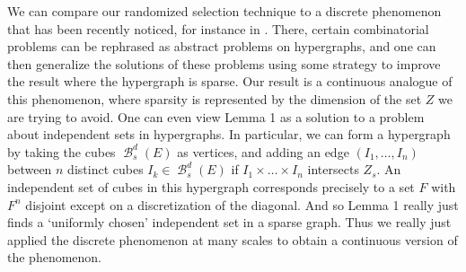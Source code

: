 \documentclass[dvipsnames,letterpaper,12pt]{article}
\numberwithin{equation}{section}
\theoremstyle{plain}
\theoremstyle{remark}
\DeclareMathOperator{\B}{\mathcal{B}}
\begin{document}
We can compare our randomized selection technique to a discrete phenomenon that has been recently noticed, for instance in \cite{BaloghMorrisSamotij}. There, certain combinatorial problems can be rephrased as abstract problems on hypergraphs, and one can then generalize the solutions of these problems using some strategy to improve the result where the hypergraph is sparse. Our result is a continuous analogue of this phenomenon, where sparsity is represented by the dimension of the set $Z$ we are trying to avoid. One can even view Lemma 1 as a solution to a problem about independent sets in hypergraphs. In particular, we can form a hypergraph by taking the cubes $\B^d_s(E)$ as vertices, and adding an edge $(I_1, \dots, I_n)$ between $n$ distinct cubes $I_k \in \B^d_s(E)$ if $I_1 \times \dots \times I_n$ intersects $Z_s$. An independent set of cubes in this hypergraph corresponds precisely to a set $F$ with $F^n$ disjoint except on a discretization of the diagonal. And so Lemma 1 really just finds a `uniformly chosen' independent set in a sparse graph. Thus we really just applied the discrete phenomenon at many scales to obtain a continuous version of the phenomenon.










\end{document}
